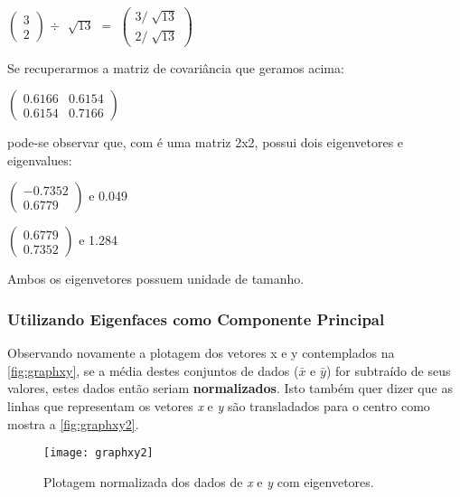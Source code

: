 \begin{center}
	$\begin{pmatrix} 3 \\ 2 \end{pmatrix}$ 
	$\div$  
	$\sqrt[]{13}$ $=$ 
	$\begin{pmatrix} 3 / \sqrt[]{13} \\ 2/\sqrt[]{13} \end{pmatrix}$
\end{center}

Se recuperarmos a matriz de covariância que geramos acima:

\begin{center}
	$\begin{pmatrix} 0.6166 & 0.6154 \\ 0.6154 & 0.7166 \end{pmatrix}$
\end{center}

pode-se observar que, com é uma matriz 2x2, possui dois eigenvetores e eigenvalues:

\begin{center}
$\begin{pmatrix} -0.7352 \\ 0.6779 \end{pmatrix}$  e 0.049

$\begin{pmatrix} 0.6779 \\ 0.7352 \end{pmatrix}$  e 1.284
\end{center}

Ambos os eigenvetores possuem unidade de tamanho.

\subsubsection{Utilizando Eigenfaces como Componente Principal}\label{subsec:eigenacp}

Observando novamente a plotagem dos vetores x e y contemplados na \autoref{fig:graphxy}, se a média destes conjuntos de dados ($\bar{x}$ e $\bar{y}$) for subtraído de seus valores, estes dados então seriam \textbf{normalizados}. Isto também quer dizer que as linhas que representam os vetores \textit{x} e \textit{y} são transladados para o centro como mostra a \autoref{fig:graphxy2}. 

\begin{figure}[h]
	\centering
	\texttt{[image: graphxy2]}
	\caption{Plotagem normalizada dos dados de \textit{x} e \textit{y} com eigenvetores.}
	\label{fig:graphxy2}
\end{figure}


